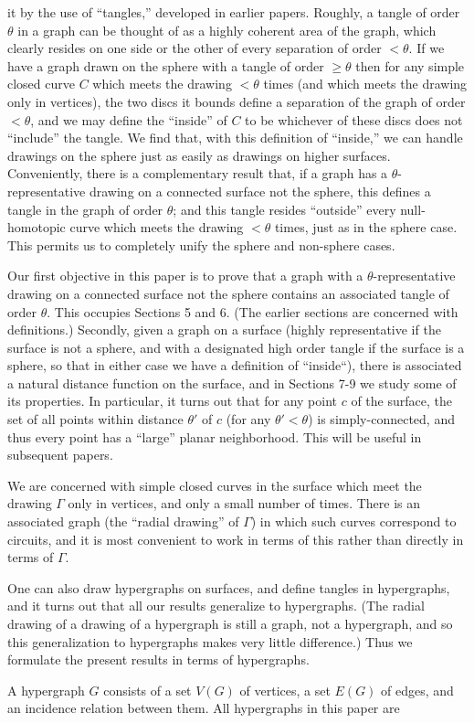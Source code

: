 \noindent it by the use of ``tangles,'' developed in earlier papers. Roughly, a tangle of order $\theta$ in a graph can be thought of as a highly coherent area of the graph, which clearly resides on one side or the other of every separation of order $< \theta$. If we have a graph drawn on the sphere with a tangle of order $\ge \theta$ then for any simple closed curve $C$ which meets the drawing $< \theta$ times (and which meets the drawing only in vertices), the two discs it bounds define a separation of the graph of order $< \theta$, and we may define the ``inside'' of $C$ to be whichever of these discs does not ``include'' the tangle. We find that, with this definition of ``inside,'' we can handle drawings on the sphere just as easily as drawings on higher surfaces. Conveniently, there is a complementary result that, if a graph has a $\theta$-representative drawing on a connected surface not the sphere, this defines a tangle in the graph of order $\theta$; and this tangle resides ``outside'' every null-homotopic curve which meets the drawing $< \theta$ times, just as in the sphere case. This permits us to completely unify the sphere and non-sphere cases.

Our first objective in this paper is to prove that a graph with a $\theta$-representative drawing on a connected surface not the sphere contains an associated tangle of order $\theta$. This occupies Sections 5 and 6. (The earlier sections are concerned with definitions.) Secondly, given a graph on a surface (highly representative if the surface is not a sphere, and with a designated high order tangle if the surface is a sphere, so that in either case we have a definition of ``inside``), there is associated a natural distance function on the surface, and in Sections 7-9 we study some of its properties. In particular, it turns out that for any point $c$ of the surface, the set of all points within distance $\theta'$ of $c$ (for any $\theta' < \theta$) is simply-connected, and thus every point has a ``large'' planar neighborhood. This will be useful in subsequent papers.

We are concerned with simple closed curves in the surface which meet the drawing $\Gamma$ only in vertices, and only a small number of times. There is an associated graph (the ``radial drawing'' of $\Gamma$) in which such curves correspond to circuits, and it is most convenient to work in terms of this rather than directly in terms of $\Gamma$.

One can also draw hypergraphs on surfaces, and define tangles in hypergraphs, and it turns out that all our results generalize to hypergraphs. (The radial drawing of a drawing of a hypergraph is still a graph, not a hypergraph, and so this generalization to hypergraphs makes very little difference.) Thus we formulate the present results in terms of hypergraphs.


A hypergraph $G$ consists of a set $V(G)$ of vertices, a set $E(G)$ of edges, and an incidence relation between them. All hypergraphs in this paper are
